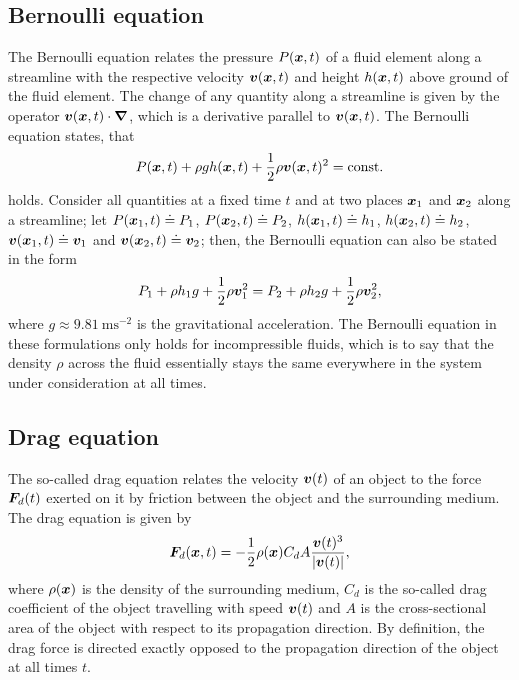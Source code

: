 \documentclass[a4paper,11pt]{report}
\begin{document}
\subsection{Bernoulli equation}
The Bernoulli equation relates the pressure $P(\bm{x},t)$ of a fluid element along a streamline with the respective velocity $\bm{v}(\bm{x},t)$ and height $h(\bm{x},t)$ above ground of the fluid element. The change of any quantity along a streamline is given by the operator $\bm{v}(\bm{x},t)\cdot \bm{\nabla}$, which is a derivative parallel to $\bm{v}(\bm{x},t)$. The Bernoulli equation states, that \begin{equation}
P(\bm{x},t) + \rho g h(\bm{x},t) + \frac{1}{2}\rho \bm{v}(\bm{x},t)^2 = \text{const.}
\end{equation} holds. Consider all quantities at a fixed time $t$ and at two places $\bm{x}_1$ and $\bm{x}_2$ along a streamline; let $P(\bm{x}_1,t) \doteq P_1$, $P(\bm{x}_2,t) \doteq P_2$, $h(\bm{x}_1,t) \doteq h_1$, $h(\bm{x}_2,t) \doteq h_2$, $\bm{v}(\bm{x}_1,t) \doteq \bm{v}_1$ and $\bm{v}(\bm{x}_2,t) \doteq \bm{v}_2$; then, the Bernoulli equation can also be stated in the form
\begin{equation}
P_1 + \rho h_1 g + \frac{1}{2}\rho \bm{v}_1^2 = P_2 + \rho h_2 g + \frac{1}{2}\rho \bm{v}_2^2,
\end{equation} where $g \approx \SI{9.81}{\meter\second^{-2}}$ is the gravitational acceleration. The Bernoulli equation in these formulations only holds for incompressible fluids, which is to say that the density $\rho$ across the fluid essentially stays the same everywhere in the system under consideration at all times.

\subsection{Drag equation}
The so-called drag equation relates the velocity $\bm{v}(t)$ of an object to the force $\bm{F}_d(t)$ exerted on it by friction between the object and the surrounding medium. The drag equation is given by \begin{equation}
\bm{F}_d(\bm{x},t) = -\frac{1}{2}\rho(\bm{x}) C_d A\frac{\bm{v}(t)^3}{|\bm{v}(t)|}, 
\end{equation} where $\rho(\bm{x})$ is the density of the surrounding medium, $C_d$ is the so-called drag coefficient of the object travelling with speed $\bm{v}(t)$ and $A$ is the cross-sectional area of the object with respect to its propagation direction. By definition, the drag force is directed exactly opposed to the propagation direction of the object at all times $t$.
\end{document}
